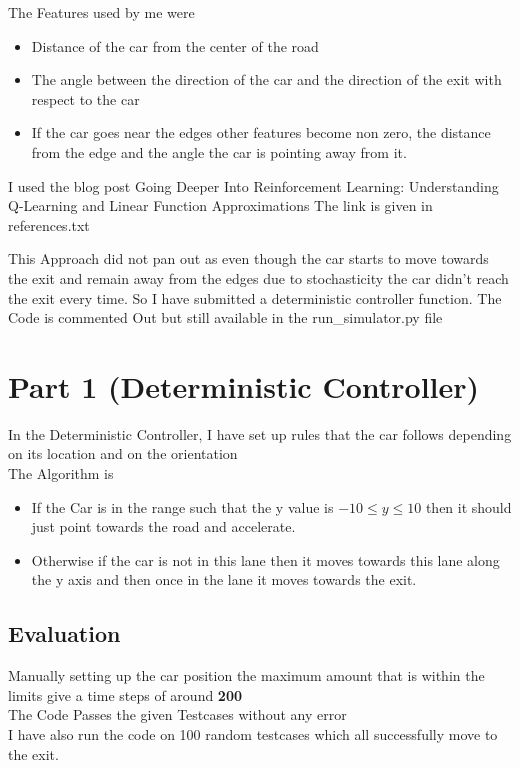 \documentclass[10pt]{article}
\begin{document}
\noindent
The Features used by me were
\begin{itemize}
    \item Distance of the car from the center of the road
    \item The angle between the direction of the car and the direction of the exit with respect to the car
    \item If the car goes near the edges other features become non zero, the distance from the edge and the angle the car is pointing away from it. 
\end{itemize}

I used the blog post Going Deeper Into Reinforcement Learning: Understanding Q-Learning and Linear Function Approximations
The link is given in references.txt

This Approach did not pan out as even though the car starts to move towards the exit and remain away from the edges due to stochasticity the car didn't reach the exit every time. So I have submitted a deterministic controller function.
The Code is commented Out but still available in the run\_simulator.py file 

\section{Part 1 (Deterministic Controller)}
In the Deterministic Controller, I have set up rules that the car follows depending on its location and on the orientation
\\ The Algorithm is 
\begin{itemize}
    \item If the Car is in the range such that the y value is $-10 \le y \le 10$ then it should just point towards the road and accelerate.
    \item Otherwise if the car is not in this lane then it moves towards this lane along the y axis and then once in the lane it moves towards the exit.
\end{itemize}

\subsection{Evaluation}
    Manually setting up the car position the maximum amount that is within the limits give a time steps of around \textbf{200}
    \\ The Code Passes the given Testcases without any error
    \\ I have also run the code on 100 random testcases which all successfully move to the exit.
    
\end{document}
